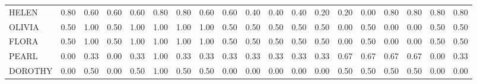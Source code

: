 \begin{table}[!h]
{\begin{tabular}[t]{lrrrrrrrrrrrrrrrrrr}
HELEN & 0.80 & 0.60 & 0.60 & 0.60 & 0.80 & 0.80 & 0.60 & 0.60 & 0.40 & 0.40 & 0.40 & 0.20 & 0.20 & 0.00 & 0.80 & 0.80 & 0.80 & 0.80\\
OLIVIA & 0.50 & 1.00 & 0.50 & 1.00 & 1.00 & 1.00 & 1.00 & 0.50 & 0.50 & 0.50 & 0.50 & 0.50 & 0.00 & 0.50 & 0.00 & 0.00 & 0.50 & 0.50\\
FLORA & 0.50 & 1.00 & 0.50 & 1.00 & 1.00 & 1.00 & 1.00 & 0.50 & 0.50 & 0.50 & 0.50 & 0.50 & 0.00 & 0.50 & 0.00 & 0.00 & 0.50 & 0.50\\
PEARL & 0.00 & 0.33 & 0.00 & 0.33 & 1.00 & 0.33 & 0.33 & 0.33 & 0.33 & 0.33 & 0.33 & 0.33 & 0.67 & 0.67 & 0.67 & 0.67 & 0.00 & 0.33\\
DOROTHY & 0.00 & 0.50 & 0.00 & 0.50 & 1.00 & 0.50 & 0.50 & 0.00 & 0.00 & 0.00 & 0.00 & 0.00 & 0.50 & 0.50 & 0.50 & 0.50 & 0.00 & 0.00\\
\bottomrule
\end{tabular}}
\end{table}
